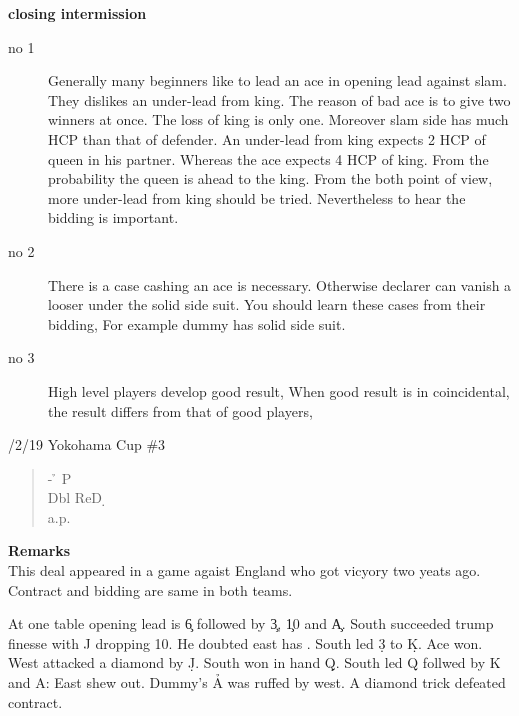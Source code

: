 {\bf closing intermission}\\
\begin{description}
\item[no 1]{
Generally many beginners like to lead an ace in opening lead 
against slam. They dislikes an under-lead from king. The reason
of bad ace is to give two winners at once. The loss of king is
only one. Moreover slam side has much HCP than that of defender.
An under-lead from king expects  2 HCP of queen in 
his partner. Whereas the ace expects 4 HCP of king. From the
probability the queen is ahead to the king. From the both 
point of view, more under-lead from king should be tried.
Nevertheless to hear the bidding is important. 

}
\item[no 2]{
There is a case cashing an ace is necessary.
Otherwise declarer can vanish a looser under the
solid side suit. You should learn these cases 
from their bidding, For example dummy has solid side
suit.

}
\item[no 3]{
High level players develop good result, 
When good result is in coincidental, the result
differs from that of good players,

}
\end{description}

\vspace{0.5cm}
/2/19 Yokohama Cup  \#3
\begin{quote}
%
  {}%
  {}
  {}%
  {}%
\end{quote}
\begin{quote}
\begin{bidding}
- \h  \> P \s \\
Dbl  \> ReD \d  {}\s \\
a.p.
\end{bidding}
\end{quote}
{\bf Remarks}\\

This deal appeared in a game agaist England who got vicyory two yeats ago.
Contract and bidding are same in both teams.

At one table opening lead is \c 6 followed by \c 3, \c 10 and \c A.
South succeeded trump finesse with \s J dropping 10. He doubted east has
. South led \d 3 to \d K. Ace won. West attacked a diamond by \d J.
South won in hand \d Q. South led \s Q follwed by \s K and \s A:
East shew out. Dummy's \h A was ruffed by west. A diamond trick defeated
contract.

